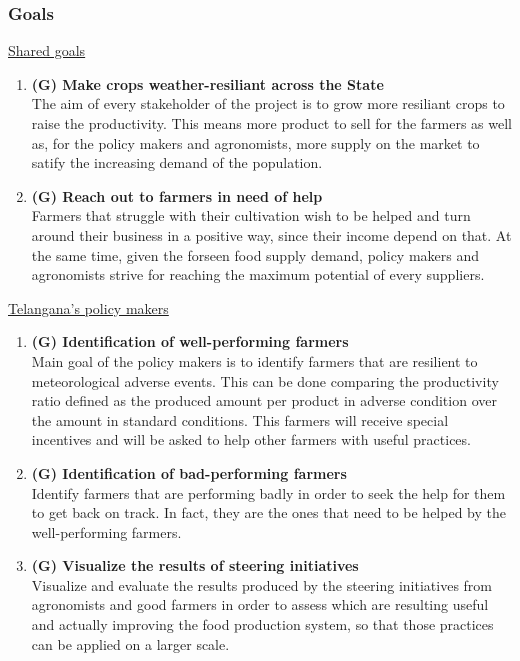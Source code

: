 \documentclass[table, 12pt]{article}
\begin{document}
\subsubsection{Goals}
\underline{Shared goals}
\begin{enumerate}
    \item \textbf{(G) Make crops weather-resiliant across the State} \\ The aim of every stakeholder of the project is to grow more resiliant crops to raise the productivity. This means more product to sell for the farmers as well as, for the policy makers and agronomists, more supply on the market to satify the increasing demand of the population.
    \item  \textbf{(G) Reach out to farmers in need of help} \\ Farmers that struggle with their cultivation wish to be helped and turn around their business in a positive way, since their income depend on that. At the same time, given the forseen food supply demand, policy makers and agronomists strive for reaching the maximum potential of every suppliers.
\end{enumerate}
\underline{Telangana's policy makers}
\begin{enumerate}
    \item \textbf{(G) Identification of well-performing farmers}\\
    Main goal of the policy makers is to identify farmers that are resilient to meteorological adverse events.
    This can be done comparing the productivity ratio defined as the produced amount per product in adverse condition over the amount in standard conditions.
    This farmers will receive special incentives and will be asked to help other farmers 
    with useful practices.
    \item \textbf{(G) Identification of bad-performing farmers}\\
    Identify farmers that are performing badly in order to seek the help for them to get back on track. In fact, they are the ones that need to be helped by the well-performing farmers.
    \item \textbf{(G) Visualize the results of steering initiatives}\\
    Visualize and evaluate the results produced by the steering initiatives from agronomists and good farmers in order to assess which are resulting useful and actually improving the food production system, so that those practices can be applied on a larger scale.
\end{enumerate}
\end{document}
